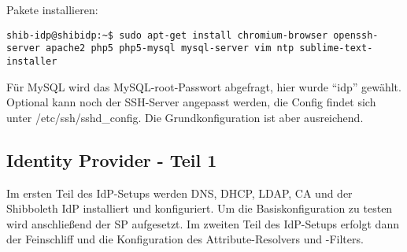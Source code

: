 Pakete installieren:
\begin{lstlisting}
shib-idp@shibidp:~$ sudo apt-get install chromium-browser openssh-server apache2 php5 php5-mysql mysql-server vim ntp sublime-text-installer
\end{lstlisting}
Für MySQL wird das MySQL-root-Passwort abgefragt, hier wurde "`idp"' gewählt.
\newline Optional kann noch der SSH-Server angepasst werden, die Config findet
sich unter \mbox{/etc/ssh/sshd\_config}. Die Grundkonfiguration ist aber
ausreichend.
\subsection{Identity Provider - Teil 1}
Im ersten Teil des IdP-Setups werden DNS, DHCP, LDAP, CA und der Shibboleth IdP
installiert und konfiguriert. Um die Basiskonfiguration zu testen wird
anschließend der SP aufgesetzt. Im zweiten Teil des IdP-Setups erfolgt dann der
Feinschliff und die Konfiguration des Attribute-Resolvers und -Filters.

